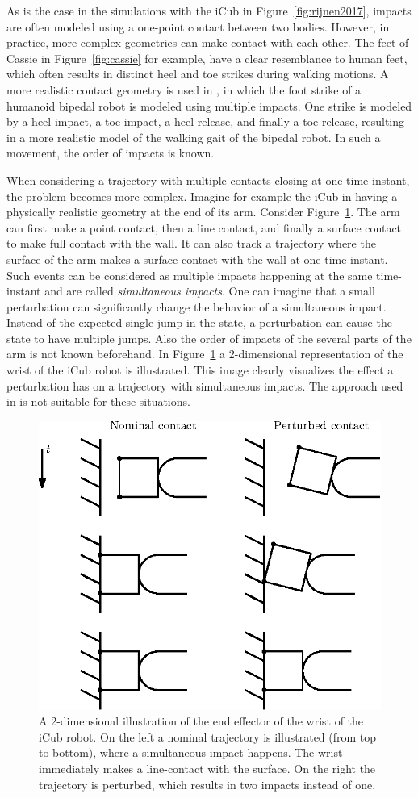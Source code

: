 \documentclass[../DC2017114Bouma.tex]{subfiles}
\begin{document}
As is the case in the simulations with the iCub in Figure~\ref{fig:rijnen2017}, impacts are often modeled using a one-point contact between two bodies. However, in practice, more complex geometries can make contact with each other. The feet of Cassie in Figure~\ref{fig:cassie} for example, have a clear resemblance to human feet, which often results in distinct heel and toe strikes during walking motions. A more realistic contact geometry is used in \cite{Zhao2015}, in which the foot strike of a humanoid bipedal robot is modeled using multiple impacts. One strike is modeled by a heel impact, a toe impact, a heel release, and finally a toe release, resulting in a more realistic model of the walking gait of the bipedal robot. In such a movement, the order of impacts is known.

When considering a trajectory with multiple contacts closing at one time-instant, the problem becomes more complex. Imagine for example the iCub in \cite{Rijnen2017a} having a physically realistic geometry at the end of its arm. Consider Figure~\ref{fig:simultaneous}. The arm can first make a point contact, then a line contact, and finally a surface contact to make full contact with the wall. It can also track a trajectory where the surface of the arm makes a surface contact with the wall at one time-instant. Such events can be considered as multiple impacts happening at the same time-instant and are called \textit{simultaneous impacts}. One can imagine that a small perturbation can significantly change the behavior of a simultaneous impact. Instead of the expected single jump in the state, a perturbation can cause the state to have multiple jumps. Also the order of impacts of the several parts of the arm is not known beforehand. In Figure~\ref{fig:simultaneous} a 2-dimensional representation of the wrist of the iCub robot is illustrated. This image clearly visualizes the effect a perturbation has on a trajectory with simultaneous impacts. The approach used in \cite{Zhao2015} is not suitable for these situations.

\begin{figure}[H]
\centering
\includegraphics[width=.45\textwidth]{simultaneous.eps}\caption{A 2-dimensional illustration of the end effector of the wrist of the iCub robot. On the left a nominal trajectory is illustrated (from top to bottom), where a simultaneous impact happens. The wrist immediately makes a line-contact with the surface. On the right the trajectory is perturbed, which results in two impacts instead of one.}\label{fig:simultaneous}
\end{figure}
\end{document}
